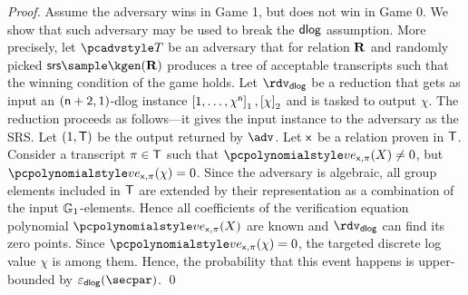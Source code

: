 \begin{proof}
	 Assume the adversary wins in Game 1, but
	does not win in Game 0. We show that such adversary may be used to break the
	$\mathsf{dlog}$ assumption. More precisely, let $\tdv$ be an adversary that for
	relation $\mathbf{R}$ and randomly picked $\srs \sample \kgen(\REL)$ produces a tree
	of acceptable transcripts such that the winning condition of the game
	holds. Let $\rdvdlog$ be a reduction that gets as input an
	$(\mathsf{n} + 2, 1)$-dlog instance $\left[1, \ldots, \chi^{\mathsf{n}}\right]_{1}, \left[\chi\right]_{2}$
	and is tasked to output $\chi$. The reduction proceeds as follows---it gives
	the input instance to the adversary as the SRS. Let $(1, \mathsf{T})$ be the output
	returned by $\adv$. Let $\mathsf{x}$ be a relation proven in $\mathsf{T}$.  Consider a
	transcript $\pi \in \mathsf{T}$ such that $\vereq_{\inp, \zkproof}(X) \neq 0$,
	but $\vereq_{\inp, \zkproof}(\chi) = 0$. Since the adversary is algebraic, all
	group elements included in $\mathsf{T}$ are extended by their representation as a
	combination of the input $\mathbb{G}_1$-elements. Hence all coefficients of the
	verification equation polynomial $\vereq_{\inp, \zkproof}(X)$ are known and
	$\rdvdlog$ can find its zero points. Since
	$\vereq_{\inp, \zkproof}(\chi) = 0$, the targeted discrete log value $\chi$ is
	among them.  Hence, the probability that this event happens is upper-bounded
	by $\epsdlog(\secpar)$. \qed
\end{proof}
\fi

